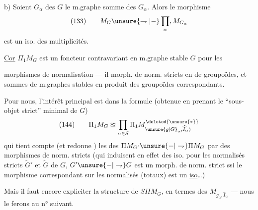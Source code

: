 b) Soient $G_\alpha$ des   $G$ le m.graphe somme des $G_\alpha$. Alors le morphisme
\[
(133)\qquad M_G\unsure{\rightharpoondown|{-}}\prod_\alpha, M_{G_\alpha}
\]
est un iso. des multiplicités.

\uline{Cor} $\Pi_1M_G$ est un foncteur contravariant en  m.graphe stable $G$  pour les

morphismes de normalisation — il  morph. de norm. stricts en  de groupoïdes, et sommes de m.graphes stables en produit des groupoïdes correspondants.

Pour nous, l'intérêt principal est dans la formule (obtenue en prenant le ``sous-objet strict'' minimal de $G$)
\[
(144)\qquad \Pi_1M_G\approxeq\prod_{\alpha\in S}\Pi_1M_{\unsure{g|G}_\alpha,\widehat I_\alpha)}^{\deleted{\unsure{*}}}
\]
qui tient compte  (et redonne ) les  des $\Pi M_{G'}\unsure{-|\rightharpoondown}\Pi M_G$ par des morphismes de norm. stricts (qui induisent en effet des iso. pour les normalisés stricts $\widetilde G'$ et $\widetilde G$ de $G$,
$G'\unsure{-|\rightharpoondown}G$ est un morph. de norm. strict ssi le morphisme correspondant sur les normalisés (totaux) est un \uline{iso}\ldots)

Mais il faut encore expliciter la structure de $S\Pi M_G$, en termes des $M_{g_\alpha,\widehat I_\alpha}$ — nous le ferons au n° suivant.


